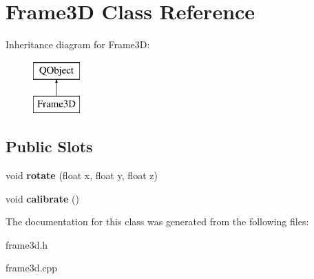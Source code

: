 \hypertarget{classFrame3D}{}\section{Frame3D Class Reference}
\label{classFrame3D}
Inheritance diagram for Frame3D\+:\begin{figure}[H]
\begin{center}
\leavevmode
\includegraphics[height=2.000000cm]{classFrame3D}
\end{center}
\end{figure}
\subsection*{Public Slots}
\begin{DoxyCompactItemize}
\item 
void {\bfseries rotate} (float x, float y, float z)\hypertarget{classFrame3D_a19be0f7e71a530ea1c80986ce7a827c6}{}\label{classFrame3D_a19be0f7e71a530ea1c80986ce7a827c6}

\item 
void {\bfseries calibrate} ()\hypertarget{classFrame3D_ab1b21cf60fcbee4957b42319964228e1}{}\label{classFrame3D_ab1b21cf60fcbee4957b42319964228e1}

\end{DoxyCompactItemize}


The documentation for this class was generated from the following files\+:\begin{DoxyCompactItemize}
\item 
frame3d.\+h\item 
frame3d.\+cpp\end{DoxyCompactItemize}
